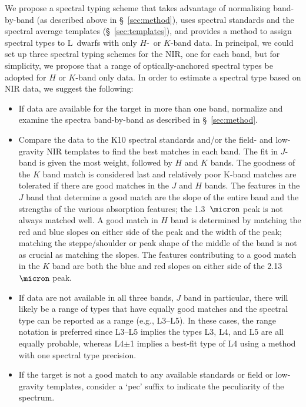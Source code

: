 \documentclass[12pt,preprint]{aastex}
\begin{document}
We propose a spectral typing scheme that takes advantage of normalizing band-by-band (as described above in \S~\ref{sec:method}), uses spectral standards and the spectral average templates (\S~\ref{sec:templates}), and provides a method to assign spectral types to L~dwarfs with only $H$-~or $K$-band data. 
In principal, we could set up three spectral typing schemes for the NIR, one for each band, but for simplicity, we propose that a range of optically-anchored spectral types be adopted for $H$ or $K$-band only data.
In order to estimate a spectral type based on NIR data, we suggest the following:
\begin{itemize}
	\item If data are available for the target in more than one band, normalize and examine the spectra band-by-band as described in \S~\ref{sec:method}.
	\item Compare the data to the K10 spectral standards and/or the field- and low-gravity NIR templates to find the best matches in each band. 
	The fit in $J$-band is given the most weight, followed by $H$ and $K$ bands. The goodness of the $K$ band match is considered last and relatively poor K-band matches are tolerated if there are good matches in the $J$ and $H$ bands. 
	The features in the $J$ band that determine a good match are the slope of the entire band and the strengths of the various absorption features; the 1.3~$\micron$ peak is not always matched well. 
	A good match in $H$ band is determined by matching the red and blue slopes on either side of the peak and the width of the peak; matching the steppe/shoulder or peak shape of the middle of the band is not as crucial as matching the slopes. 
The features contributing to a good match in the $K$ band are both the blue and red slopes on either side of the 2.13~$\micron$ peak.	
	\item If data are not available in all three bands, $J$ band in particular, there will likely be a range of types that have equally good matches and the spectral type can be reported as a range (e.g., L3--L5). In these cases, the range notation is preferred since L3--L5 implies the types L3, L4, and L5 are all equally probable, whereas L4$\pm$1 implies a best-fit type of L4 using a method with one spectral type precision.
	\item If the target is not a good match to any available standards or field or low-gravity templates, consider a `pec' suffix to indicate the peculiarity of the spectrum.

\end{itemize}
\end{document}
